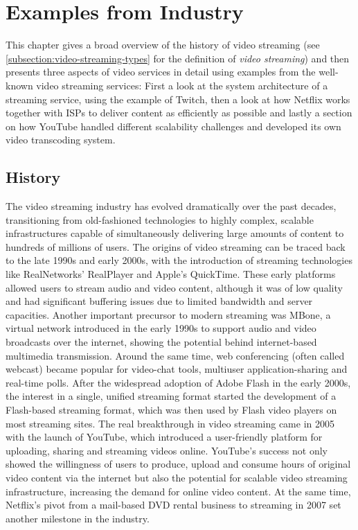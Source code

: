 \chapter{Examples from Industry}\label{chapter:examples}

This chapter gives a broad overview of the history of video streaming (see \autoref{subsection:video-streaming-types} for the definition of \textit{video streaming}) and then presents three aspects of video services in detail using examples from the well-known video streaming services: First a look at the system architecture of a streaming service, using the example of Twitch, then a look at how Netflix works together with \ac{ISPs} to deliver content as efficiently as possible and lastly a section on how YouTube handled different scalability challenges and developed its own video transcoding system.     

\section{History}
The video streaming industry has evolved dramatically over the past decades, transitioning from old-fashioned technologies to highly complex, scalable infrastructures capable of simultaneously delivering large amounts of content to hundreds of millions of users. The origins of video streaming can be traced back to the late 1990s and early 2000s, with the introduction of streaming technologies like RealNetworks' RealPlayer and Apple's QuickTime. These early platforms allowed users to stream audio and video content, although it was of low quality and had significant buffering issues due to limited bandwidth and server capacities.
Another important precursor to modern streaming was \ac{MBone}, a virtual network introduced in the early 1990s to support audio and video broadcasts over the internet, showing the potential behind internet-based multimedia transmission. Around the same time, web conferencing (often called webcast) became popular for video-chat tools, multiuser application-sharing and real-time polls. 
After the widespread adoption of Adobe Flash in the early 2000s, the interest in a single, unified streaming format started the development of a Flash-based streaming format, which was then used by Flash video players on most streaming sites.
The real breakthrough in video streaming came in 2005 with the launch of YouTube, which introduced a user-friendly platform for uploading, sharing and streaming videos online. 
YouTube's success not only showed the willingness of users to produce, upload and consume hours of original video content via the internet but also the potential for scalable video streaming infrastructure, increasing the demand for online video content. At the same time, Netflix's pivot from a mail-based DVD rental business to streaming in 2007 set another milestone in the industry. 

